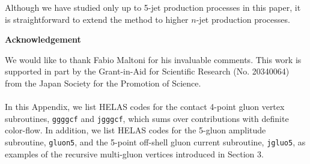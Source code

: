 \documentclass[a4paper,11pt]{article}
\begin{document}
 Although we have studied only up to 5-jet production processes in this paper, it is straightforward to extend
 the method to higher $n$-jet production processes.

\begin{center}
{\bf Acknowledgement}
\end{center}
We would like to thank Fabio Maltoni for his invaluable comments.  This work is supported in part by
 the Grant-in-Aid for Scientific Research (No. 20340064)
 from the Japan Society for the Promotion of Science.\\

\vspace{1em}
\\

In this Appendix, we list HELAS codes for the contact 4-point
 gluon vertex subroutines,
 {\tt ggggcf} and {\tt jgggcf},
 which sums over contributions with definite color-flow.
 In addition, we list HELAS codes for the 5-gluon
 amplitude subroutine, {\tt gluon5}, and
 the 5-point off-shell gluon current subroutine,
 {\tt jgluo5}, as examples of the recursive multi-gluon
 vertices introduced in Section 3.\\
\end{document}
